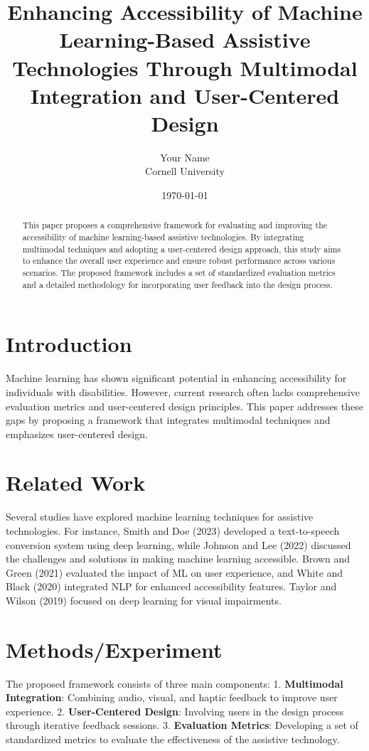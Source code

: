 \documentclass{article}
\title{Enhancing Accessibility of Machine Learning-Based Assistive Technologies Through Multimodal Integration and User-Centered Design}
\author{Your Name \\ Cornell University}
\date{\today}
\begin{document}
\maketitle

\begin{abstract}
This paper proposes a comprehensive framework for evaluating and improving the accessibility of machine learning-based assistive technologies. By integrating multimodal techniques and adopting a user-centered design approach, this study aims to enhance the overall user experience and ensure robust performance across various scenarios. The proposed framework includes a set of standardized evaluation metrics and a detailed methodology for incorporating user feedback into the design process.
\end{abstract}

\section{Introduction}
Machine learning has shown significant potential in enhancing accessibility for individuals with disabilities. However, current research often lacks comprehensive evaluation metrics and user-centered design principles. This paper addresses these gaps by proposing a framework that integrates multimodal techniques and emphasizes user-centered design.

\section{Related Work}
\label{sec:related_work}
Several studies have explored machine learning techniques for assistive technologies. For instance, Smith and Doe (2023) developed a text-to-speech conversion system using deep learning, while Johnson and Lee (2022) discussed the challenges and solutions in making machine learning accessible. Brown and Green (2021) evaluated the impact of ML on user experience, and White and Black (2020) integrated NLP for enhanced accessibility features. Taylor and Wilson (2019) focused on deep learning for visual impairments.

\section{Methods/Experiment}
\label{sec:methods}
The proposed framework consists of three main components: 
1. \textbf{Multimodal Integration}: Combining audio, visual, and haptic feedback to improve user experience.
2. \textbf{User-Centered Design}: Involving users in the design process through iterative feedback sessions.
3. \textbf{Evaluation Metrics}: Developing a set of standardized metrics to evaluate the effectiveness of the assistive technology.
\end{document}
